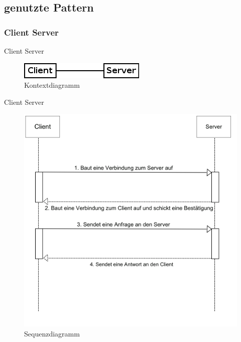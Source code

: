 \documentclass{beamer}
\begin{document}
	\subsection{genutzte Pattern}
	\subsubsection{Client Server}
	\begin{frame}{Client Server}
		\begin{figure}
			\centering
			\includegraphics[width=0.7\linewidth]{Grafik/Diagramm/Pattern/ClientServer/Kontext}
			\caption{Kontextdiagramm}
			\label{fig:Kontext1}
		\end{figure}
	\end{frame}
	\begin{frame}{Client Server}	
		\begin{figure}
			\centering
			\includegraphics[height=0.8\textheight]{Grafik/Diagramm/Pattern/ClientServer/Sequenzdiagramm}
			\caption{Sequenzdiagramm}
			\label{fig:Sequenz1}
		\end{figure}
	\end{frame}
	
\end{document}
